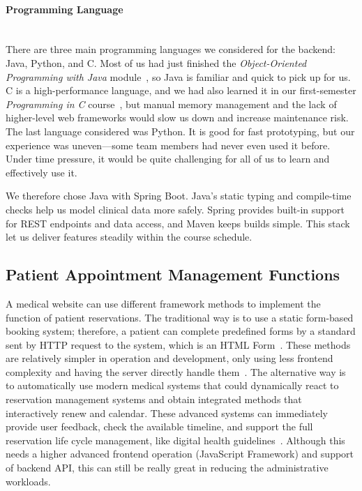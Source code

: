 \paragraph{Programming Language}\mbox{}\\
There are three main programming languages we considered for the backend: Java, Python, and C. Most of us had just finished the \textit{Object-Oriented Programming with Java} module~\cite{uob-oop-java-2024}, so Java is familiar and quick to pick up for us. C is a high-performance language, and we had also learned it in our first-semester \textit{Programming in C} course~\cite{uob-prog-in-c-2024}, but manual memory management and the lack of higher-level web frameworks would slow us down and increase maintenance risk. The last language considered was Python. It is good for fast prototyping, but our experience was uneven—some team members had never even used it before. Under time pressure, it would be quite challenging for all of us to learn and effectively use it.

We therefore chose Java with Spring Boot. Java's static typing and compile-time checks help us model clinical data more safely. Spring provides built-in support for REST endpoints and data access, and Maven keeps builds simple. This stack let us deliver features steadily within the course schedule.

\subsection{Patient Appointment Management Functions}
\label{subsec:patient-appointment-management}

A medical website can use different framework methods to implement the function of patient reservations. The traditional way is to use a static form-based booking system; therefore, a patient can complete predefined forms by a standard sent by HTTP request to the system, which is an HTML Form~\cite{mdn-html-forms}. These methods are relatively simpler in operation and development, only using less frontend complexity and having the server directly handle them~\cite{spring-boot-web}. The alternative way is to automatically use modern medical systems that could dynamically react to reservation management systems and obtain integrated methods that interactively renew and calendar. These advanced systems can immediately provide user feedback, check the available timeline, and support the full reservation life cycle management, like digital health guidelines~\cite{who-digital-health}. Although this needs a higher advanced frontend operation (JavaScript Framework) and support of backend API, this can still be really great in reducing the administrative workloads.

